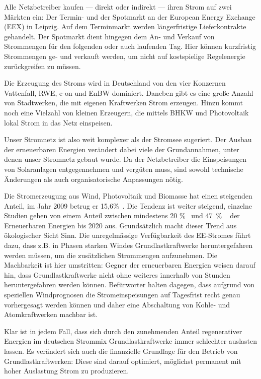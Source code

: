 \documentclass[12pt,BCOR=8.5mm]{scrartcl}
\begin{document}
\begin{enumerate}
    Alle Netzbetreiber kaufen --- direkt oder indirekt --- ihren Strom
    auf zwei Märkten ein: Der Termin- und der Spotmarkt an der European
    Energy Exchange (EEX) in Leipzig. Auf dem Terminmarkt werden
    längerfristige Lieferkontrakte gehandelt. Der Spotmarkt dient
    hingegen dem An- und Verkauf von Strommengen für den folgenden oder
    auch laufenden Tag. Hier können kurzfristig Strommengen ge- und
    verkauft werden, um nicht auf kostspielige Regelenergie
    zurückgreifen zu müssen.

    Die Erzeugung des Stroms wird in Deutschland von den vier Konzernen
    Vattenfall, RWE, e-on und EnBW dominiert. Daneben gibt es eine
    große Anzahl von Stadtwerken, die mit eigenen Kraftwerken Strom
    erzeugen. Hinzu kommt noch eine Vielzahl von kleinen Erzeugern, die
    mittels BHKW und Photovoltaik lokal Strom in das Netz einspeisen.
\end{enumerate}

Unser Stromnetz ist also weit komplexer als der Stromsee sugeriert.  Der
Ausbau der erneuerbaren Energien verändert dabei viele der
Grundannahmen, unter denen unser Stromnetz gebaut wurde. Da der
Netzbetreiber die Einspeisungen von Solaranlagen entgegennehmen und
vergüten muss, sind sowohl technische Änderungen als auch
organisatorische Anpassungen nötig.

Die Stromerzeugung aus Wind, Photovoltaik und Biomasse hat einen
steigenden Anteil, im Jahr 2009 betrug er
15,6\%~\cite{web:bmwi-energiedaten}.  Die Tendenz ist weiter steigend,
einzelne Studien gehen von einem Anteil zwischen mindestens 20
\%~\cite{dena05netzstudie1} und 47~\% ~\cite{iwes09simulation} der
Erneuerbaren Energien bis 2020 aus.  Grundsätzlich macht dieser Trend
aus ökologischer Sicht Sinn.  Die unregelmässige Verfügbarkeit des
EE-Stromes führt dazu, dass z.B. in Phasen starken Windes
Grundlastkraftwerke heruntergefahren werden müssen, um die zusätzlichen
Strommengen aufzunehmen. Die Machbarkeit ist hier umstritten:
Gegner der erneuerbaren Energien weisen darauf hin, dass
Grundlastkraftwerke nicht ohne weiteres innerhalb von Stunden
heruntergefahren werden können.  Befürworter halten dagegen, dass
aufgrund von speziellen Windprognosen die Stromeinspeisungen auf
Tagesfrist recht genau vorhergesagt werden können und daher eine
Abschaltung von Kohle- und Atomkraftwerken machbar ist.

Klar ist in jedem Fall, dass sich durch den zunehmenden Anteil
regenerativer Energien im deutschen Strommix Grundlastkraftwerke immer
schlechter auslasten lassen.  Es verändert sich auch die finanzielle
Grundlage für den Betrieb von Grundlastkraftwerken: Diese sind darauf
optimiert, möglichst permanent mit hoher Auslastung Strom zu
produzieren. 
\end{document}
